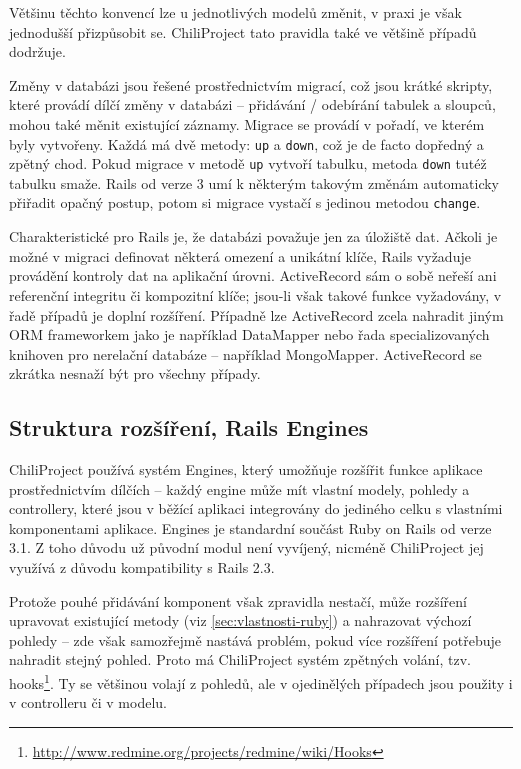 \documentclass[thesis=B,czech]{FITthesis}[2012/05/02]
\begin{document}
Většinu těchto konvencí lze u jednotlivých modelů změnit, v praxi je
však jednodušší přizpůsobit se. ChiliProject tato pravidla také ve
většině případů dodržuje.

Změny v databázi jsou řešené prostřednictvím migrací, což jsou krátké
skripty, které provádí dílčí změny v databázi -- přidávání / odebírání
tabulek a sloupců, mohou také měnit existující záznamy. Migrace se
provádí v pořadí, ve kterém byly vytvořeny. Každá má dvě metody:
\lstinline!up! a \lstinline!down!, což je de facto dopředný a zpětný
chod. Pokud migrace v metodě \lstinline!up! vytvoří tabulku, metoda
\lstinline!down! tutéž tabulku smaže. Rails od verze 3 umí k některým
takovým změnám automaticky přiřadit opačný postup, potom si migrace
vystačí s jedinou metodou \lstinline!change!.

Charakteristické pro Rails je, že databázi považuje jen za 
úložiště dat. Ačkoli je možné v migraci definovat některá omezení a unikátní klíče,
Rails vyžaduje provádění kontroly dat na aplikační úrovni.
ActiveRecord sám o sobě neřeší ani referenční integritu či
kompozitní klíče; jsou-li však takové funkce vyžadovány, v řadě případů
je doplní rozšíření. Případně lze ActiveRecord zcela nahradit jiným ORM
frameworkem jako je například DataMapper nebo řada specializovaných
knihoven pro nerelační databáze -- například MongoMapper. ActiveRecord
se zkrátka nesnaží být  pro všechny případy.

\subsection{Struktura rozšíření, Rails Engines}

ChiliProject používá systém Engines, který umožňuje rozšířit
funkce aplikace prostřednictvím dílčích  -- každý
engine může mít vlastní modely, pohledy a controllery, které jsou
v běžící aplikaci integrovány do jediného celku s vlastními komponentami
aplikace. Engines je standardní součást Ruby on Rails od verze 3.1.
Z toho důvodu už původní modul není vyvíjený, nicméně ChiliProject jej
využívá z důvodu kompatibility s Rails 2.3.

Protože pouhé přidávání komponent však zpravidla nestačí, může rozšíření
upravovat existující metody (viz
\ref{sec:vlastnosti-ruby}) a
nahrazovat výchozí pohledy -- zde však samozřejmě nastává problém, pokud
více rozšíření potřebuje nahradit stejný pohled. Proto má ChiliProject
systém zpětných volání, tzv. hooks\footnote{\url{http://www.redmine.org/projects/redmine/wiki/Hooks}}.
Ty se většinou volají z pohledů, ale v ojedinělých případech jsou
použity i v controlleru či v modelu.
\end{document}

